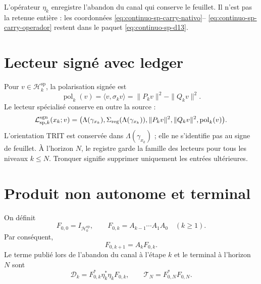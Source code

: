 L'opérateur \(\eta_k\) enregistre l'abandon du canal qui conserve le feuillet. Il
n'est pas la retenue entière : les coordonnées
\eqref{eq:continuo-sp-carry-nativo}--
\eqref{eq:continuo-sp-carry-operador} restent dans le paquet
\eqref{eq:continuo-sp-d13}.

\section{Lecteur signé avec ledger}

Pour \(v\in\mathcal H_k^{\mathrm{sp}}\), la polarisation signée est
\begin{equation}
\label{eq:continuo-sp-polarizacion-firmada}
 \operatorname{pol}_k(v)
 =\langle v,\sigma_kv\rangle
 =\|P_kv\|^2-\|Q_kv\|^2.
\end{equation}
Le lecteur spécialisé conserve en outre la source :
\begin{equation}
\label{eq:continuo-sp-lector-firmado}
 \mathcal L^{\rm sgn}_{\mathrm{sp},k}(x_k;v)
 =\bigl(
   \Lambda(\gamma_{x_k}),
   \Sigma_{\rm reg}(\Lambda(\gamma_{x_k})),
   \|P_kv\|^2,
   \|Q_kv\|^2,
   \operatorname{pol}_k(v)\bigr).
\end{equation}
L'orientation TRIT est conservée dans \(\Lambda(\gamma_{x_k})\) ; elle ne
s'identifie pas au signe de feuillet. À l'horizon \(N\), le registre garde la
famille des lecteurs pour tous les niveaux \(k\leq N\). Tronquer signifie
supprimer uniquement les entrées ultérieures.

\section{Produit non autonome et terminal}

On définit
\begin{equation}
\label{eq:continuo-sp-f-producto}
 F_{0,0}=I_{\mathcal H_0^{\mathrm{sp}}},
 \qquad
 F_{0,k}=A_{k-1}\cdots A_1A_0
 \quad(k\geq1).
\end{equation}
Par conséquent,
\begin{equation}
\label{eq:continuo-sp-f-recursion}
 F_{0,k+1}=A_kF_{0,k}.
\end{equation}
Le terme publié lors de l'abandon du canal à l'étape \(k\) et le terminal à
l'horizon \(N\) sont
\begin{equation}
\label{eq:continuo-sp-defecto-terminal}
 \mathcal D_k=F_{0,k}^*\eta_k^*\eta_kF_{0,k},
 \qquad
 \mathcal T_N=F_{0,N}^*F_{0,N}.
\end{equation}


